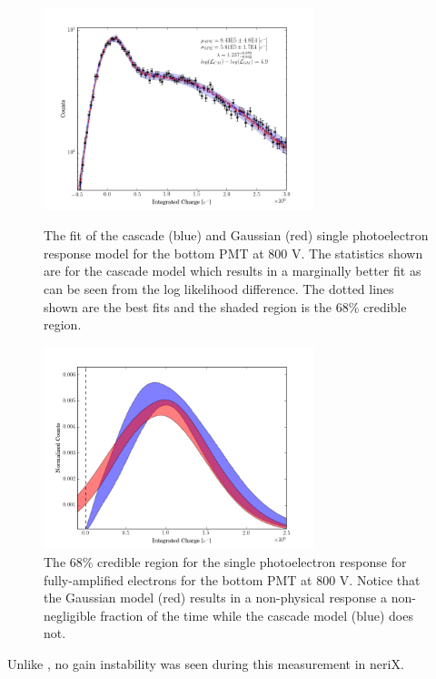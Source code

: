 \begin{figure}[p]
	\centering
	\includegraphics[width=0.7\textwidth]{nerix_pmt_best_fit}
	\caption{The fit of the cascade (blue) and Gaussian (red) single photoelectron response model for the bottom PMT at 800 V.  The statistics shown are for the cascade model which results in a marginally better fit as can be seen from the log likelihood difference.  The dotted lines shown are the best fits and the shaded region is the 68\% credible region.}
	\label{fig:nerix_pmt_best_fit}

        \vspace{\floatsep}

	\centering
	\includegraphics[width=0.7\textwidth]{nerix_spe_response}
	\caption{The 68\% credible region for the single photoelectron response for fully-amplified electrons for the bottom PMT at 800 V.  Notice that the Gaussian model (red) results in a non-physical response a non-negligible fraction of the time while the cascade model (blue) does not.}
	\label{fig:nerix_spe_response}
\end{figure}


Unlike , no gain instability was seen during this measurement in neriX.  


